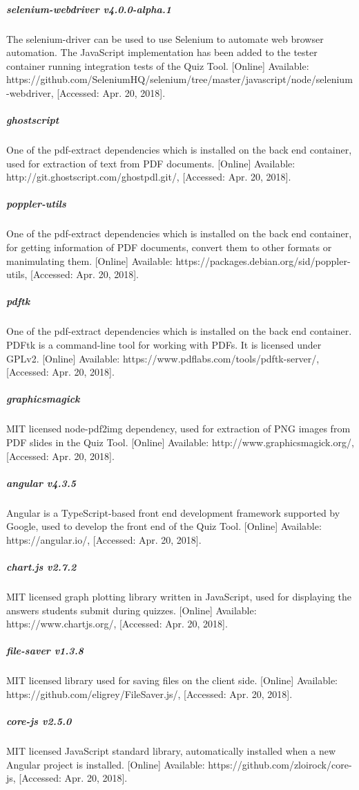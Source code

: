 \subparagraph{selenium-webdriver v4.0.0-alpha.1}
The selenium-driver can be used to use Selenium to automate web browser automation. The
JavaScript implementation has been added to the tester container running integration tests of
the Quiz Tool. [Online] Available: https://github.com/SeleniumHQ/selenium/tree/master/javascript/node/selenium-webdriver, [Accessed: Apr. 20, 2018].

\subparagraph{ghostscript}
One of the pdf-extract dependencies which is installed on the back end container, used for
extraction of text from PDF documents. [Online] Available:
http://git.ghostscript.com/ghostpdl.git/, [Accessed: Apr. 20, 2018].

\subparagraph{poppler-utils}
One of the pdf-extract dependencies which is installed on the back end container, for
getting information of PDF documents, convert them to other formats or manimulating them.
[Online] Available: https://packages.debian.org/sid/poppler-utils, [Accessed: Apr. 20, 2018].

\subparagraph{pdftk}
One of the pdf-extract dependencies which is installed on the back end container. PDFtk is
a command-line tool for working with PDFs. It is licensed under GPLv2.
[Online] Available: https://www.pdflabs.com/tools/pdftk-server/, [Accessed: Apr. 20, 2018].

\subparagraph{graphicsmagick}
MIT licensed node-pdf2img dependency, used for extraction of PNG images from PDF slides in the Quiz Tool.
[Online] Available: http://www.graphicsmagick.org/, [Accessed: Apr. 20, 2018].

\subparagraph{angular v4.3.5}
Angular is a TypeScript-based front end development framework supported by Google, used to
develop the front end of the Quiz Tool.
[Online] Available: https://angular.io/, [Accessed: Apr. 20, 2018].

\subparagraph{chart.js v2.7.2}
MIT licensed graph plotting library written in JavaScript, used for displaying the answers
students submit during quizzes.
[Online] Available: https://www.chartjs.org/, [Accessed: Apr. 20, 2018].

\subparagraph{file-saver v1.3.8}
MIT licensed library used for saving files on the client side.
[Online] Available: https://github.com/eligrey/FileSaver.js/, [Accessed: Apr. 20, 2018].

\subparagraph{core-js v2.5.0}
MIT licensed JavaScript standard library, automatically installed when a new Angular project
is installed. [Online] Available: https://github.com/zloirock/core-js, [Accessed: Apr. 20, 2018].

